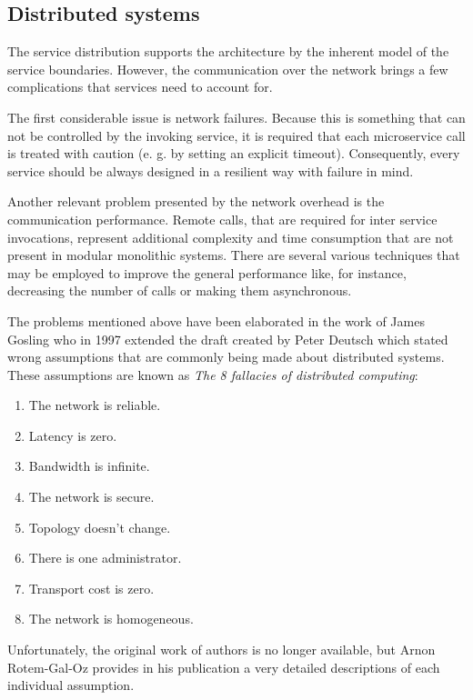 \documentclass[oneside,
  digital, %
  table,   %
  nolof,     %
  nolot,     %
]{fithesis3}
\begin{document}
\subsection{Distributed systems}

The service distribution supports the architecture by the inherent model of the service boundaries. However, the communication over the network brings a few complications that services need to account for.

The first considerable issue is network failures. Because this is something that can not be controlled by the invoking service, it is required that each microservice call is treated with caution (e. g. by setting an explicit timeout). Consequently, every service should be always designed in a resilient way with failure in mind. 

Another relevant problem presented by the network overhead is the communication performance. Remote calls, that are required for inter service invocations, represent additional complexity and time consumption that are not present in modular monolithic systems. There are several various techniques that may be employed to improve the general performance like, for instance, decreasing the number of calls or making them asynchronous.

The problems mentioned above have been elaborated in the work of James Gosling who in 1997 extended the draft created by Peter Deutsch which stated wrong assumptions that are commonly being made about distributed systems. These assumptions are known as \textit{The 8 fallacies of distributed computing}:

\begin{enumerate}
    \item The network is reliable.
    \item Latency is zero.
    \item Bandwidth is infinite.
    \item The network is secure.
    \item Topology doesn't change.
    \item There is one administrator.
    \item Transport cost is zero.
    \item The network is homogeneous.
\end{enumerate}

\noindent
Unfortunately, the original work of authors is no longer available, but Arnon Rotem-Gal-Oz provides in his publication \cite{fallacies} a very detailed descriptions of each individual assumption.
\end{document}
